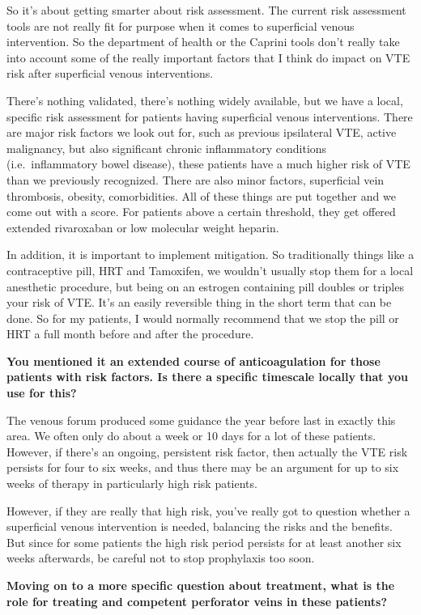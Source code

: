 \documentclass[
]{book}
\begin{document}
So it's about getting smarter about risk assessment. The current risk
assessment tools are not really fit for purpose when it comes to
superficial venous intervention. So the department of health or the
Caprini tools don't really take into account some of the really
important factors that I think do impact on VTE risk after superficial
venous interventions.

There's nothing validated, there's nothing widely available, but we have
a local, specific risk assessment for patients having superficial venous
interventions. There are major risk factors we look out for, such as
previous ipsilateral VTE, active malignancy, but also significant
chronic inflammatory conditions (i.e.~inflammatory bowel disease), these
patients have a much higher risk of VTE than we previously recognized.
There are also minor factors, superficial vein thrombosis, obesity,
comorbidities. All of these things are put together and we come out with
a score. For patients above a certain threshold, they get offered
extended rivaroxaban or low molecular weight heparin.

In addition, it is important to implement mitigation. So traditionally
things like a contraceptive pill, HRT and Tamoxifen, we wouldn't usually
stop them for a local anesthetic procedure, but being on an estrogen
containing pill doubles or triples your risk of VTE. It's an easily
reversible thing in the short term that can be done. So for my patients,
I would normally recommend that we stop the pill or HRT a full month
before and after the procedure.

\textbf{You mentioned it an extended course of anticoagulation for those
patients with risk factors. Is there a specific timescale locally that
you use for this?}

The venous forum produced some guidance the year before last in exactly
this area. We often only do about a week or 10 days for a lot of these
patients. However, if there's an ongoing, persistent risk factor, then
actually the VTE risk persists for four to six weeks, and thus there may
be an argument for up to six weeks of therapy in particularly high risk
patients.

However, if they are really that high risk, you've really got to
question whether a superficial venous intervention is needed, balancing
the risks and the benefits. But since for some patients the high risk
period persists for at least another six weeks afterwards, be careful
not to stop prophylaxis too soon.

\textbf{Moving on to a more specific question about treatment, what is the
role for treating and competent perforator veins in these patients?}
\end{document}
